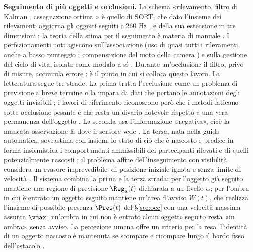 \textbf{Seguimento di più oggetti e occlusioni.} Lo schema «rilevamento, filtro di Kalman \cite{kalman1960}, assegnazione ottima \cite{kuhn1955}» è quello di SORT, che dato l'insieme dei rilevamenti aggiorna gli oggetti seguiti a 260 Hz \cite{bewley2016}, e della sua estensione in tre dimensioni \cite{weng2020}; la teoria della stima per il seguimento è materia di manuale \cite{barshalom2001}. I perfezionamenti noti agiscono sull'associazione (uso di quasi tutti i rilevamenti, anche a basso punteggio \cite{zhang2022}; compensazione del moto della camera \cite{aharon2022}) e sulla gestione del ciclo di vita, isolata come modulo a sé \cite{pang2021}. Durante un'occlusione il filtro, privo di misure, accumula errore \cite{cao2023}: è il punto in cui si colloca questo lavoro. La letteratura segue tre strade. La prima tratta l'occlusione come un problema di previsione a breve termine \cite{khurana2021} o la impara da dati che portano le annotazioni degli oggetti invisibili \cite{tokmakov2021}; i lavori di riferimento riconoscono però che i metodi faticano sotto occlusione pesante \cite{hsieh2023} e che resta un divario notevole rispetto a una vera permanenza dell'oggetto \cite{vanhoorick2023}. La seconda usa l'informazione «negativa», cioè la mancata osservazione là dove il sensore vede \cite{koch2007,wyffels2015,krejci2026}. La terza, nata nella guida automatica, sovrastima con insiemi lo stato di ciò che è nascosto \cite{orzechowski2018} e predice in forma insiemistica i comportamenti ammissibili dei partecipanti rilevati e di quelli potenzialmente nascosti \cite{koschi2021}; il problema affine dell'inseguimento con visibilità considera un evasore imprevedibile, di posizione iniziale ignota e senza limite di velocità \cite{guibas1997}. Il sistema combina la prima e la terza strada: per l'oggetto già seguito mantiene una regione di previsione $\Reg_\alpha(t)$ dichiarata a un livello $\alpha$; per l'ombra in cui è entrato un oggetto seguito mantiene un'area d'avviso $W(t)$, che realizza l'insieme di possibile presenza $\Pres(t)$ del \S\ref{sec:occ} con una velocità massima assunta $\vmax$; un'ombra in cui non è entrato alcun oggetto seguito resta «in ombra», senza avviso. La percezione umana offre un criterio per la resa: l'identità di un oggetto nascosto è mantenuta se scompare e ricompare lungo il bordo fisso dell'ostacolo \cite{scholl1999}.

